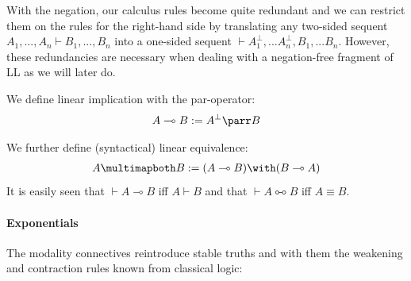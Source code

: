 \documentclass[DIN, pagenumber=false, fontsize=11pt, parskip=half, colorinlistoftodos, svgnames]{scrartcl}
\begin{document}
	With the negation, our calculus rules become quite redundant and we can restrict them on the rules for the right-hand side by translating any two-sided sequent 
	$A_1, ..., A_n \vdash B_1, ..., B_n$ 
	into a one-sided sequent 
	$\vdash A_1^\bot, ... A_n^\bot, B_1, ... B_n$. 
	However, these redundancies are necessary when dealing with a negation-free fragment of LL as we will later do.
	
	
	\begin{definition}
		We define linear implication with the par-operator:
		\begin{align*}
			A \multimap B := A^\bot \parr B
		\end{align*}
		
		We further define (syntactical) linear equivalence:
		\begin{align*}
			A \multimapboth B := (A \multimap B) \with (B \multimap A)
		\end{align*}
		It is easily seen that $\vdash A\multimap B$ iff $A \vdash B$ and that $\vdash A \multimapboth B$ iff $A \equiv B$. 
	\end{definition}
	
	\paragraph{Exponentials }
	The modality connectives reintroduce stable truths and with them the weakening and contraction rules known from classical logic:
	
\end{document}
